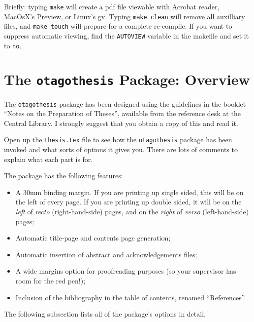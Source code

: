 Briefly: typing {\tt make} will create a pdf file viewable with
Acrobat reader, MacOsX's Preview, or Linux's gv.
Typing {\tt make clean} will remove all auxilliary
files, and {\tt make touch} will prepare for a complete re-compile.
If you want to suppress automatic viewing, find the \verb|AUTOVIEW|
variable in the makefile and set it to \verb|no|.

\section{The {\tt otagothesis} Package: Overview}
\label{sec:overview}

The {\tt otagothesis} package has been designed using the guidelines in
the booklet ``Notes on the Preparation of Theses'', available from the
reference desk at the Central Library.  I strongly suggest that you
obtain a copy of this and read it.

Open up the {\tt thesis.tex} file to see how the {\tt otagothesis}
package has been invoked and what sorts of options it gives you.  There
are lots of comments to explain what each part is for.

The package has the following features:
\begin{itemize}
\item A 30mm binding margin.  If you are printing up single sided,
this will be on the left of every page.  If you are printing up double
sided, it will be on the {\em left} of {\em recto} (right-hand-side)
pages, and on the {\em right} of {\em verso} (left-hand-side) pages;
\item Automatic title-page and contents page generation;
\item Automatic insertion of abstract and acknowledgements files;
\item A wide margins option for proofreading purposes (so your
supervisor has room for the red pen!);
\item Inclusion of the bibliography in the table of contents, renamed
``References''.
\end{itemize}
The following subsection lists all of the package's options in detail. 

